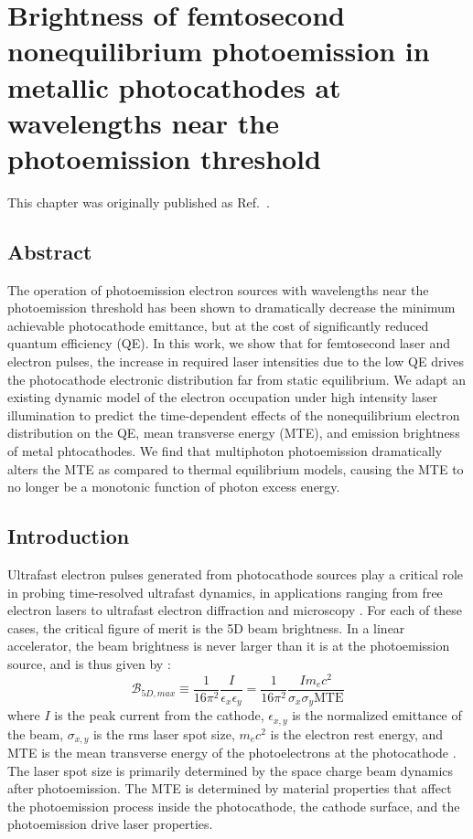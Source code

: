\chapter{Brightness of femtosecond nonequilibrium photoemission in metallic photocathodes at wavelengths near the photoemission threshold}

This chapter was originally published as Ref.~\cite{bae2018_BrightnessFemtosecondNonequilibrium}.

\section{Abstract}
The operation of photoemission electron sources with wavelengths near the photoemission threshold has been shown to dramatically decrease the minimum achievable photocathode emittance, but at the cost of significantly reduced quantum efficiency (QE). In this work, we show that for femtosecond laser and electron pulses, the increase in required laser intensities due to the low QE drives the photocathode electronic distribution far from static equilibrium. We adapt an existing dynamic model of the electron occupation under high intensity laser illumination to predict the time-dependent effects of the nonequilibrium electron distribution on the QE, mean transverse energy (MTE), and emission brightness of metal phtocathodes. We find that multiphoton photoemission dramatically alters the MTE as compared to thermal equilibrium models, causing the MTE to no longer be a monotonic function of photon excess energy. 

\section{Introduction}
Ultrafast  electron pulses generated from photocathode sources play a critical role in probing time-resolved ultrafast dynamics, in applications ranging from free electron lasers \cite{fel} to ultrafast electron diffraction \cite{ued} and microscopy \cite{uem}. For each of these cases, the critical figure of merit is the 5D beam brightness. In a linear accelerator, the beam brightness is never larger than it is at the photoemission source, and is thus given by \cite{Rhee1992,ttm,pancake}:
\begin{equation}\label{eq_brightness}
	\mathcal{B}_{5D, max} \equiv \frac{1}{16 \pi^2} \frac{I}{\epsilon_x \epsilon_y} = \frac{1}{16 \pi^2} \frac{I m_e c^2}{\sigma_x \sigma_y \textrm{MTE}} 
\end{equation}
where $I$ is the peak current from the cathode, $\epsilon_{x,y}$ is the normalized emittance of the beam, $\sigma_{x,y}$ is the rms laser spot size, $m_e c^2$ is the electron rest energy, and MTE is the mean transverse energy of the photoelectrons at the photocathode \cite{Musumeci2018}. The laser spot size is primarily determined by the space charge beam dynamics after photoemission. The MTE is determined by material properties that affect the photoemission process inside the photocathode, the cathode surface, and the photoemission drive laser properties.


